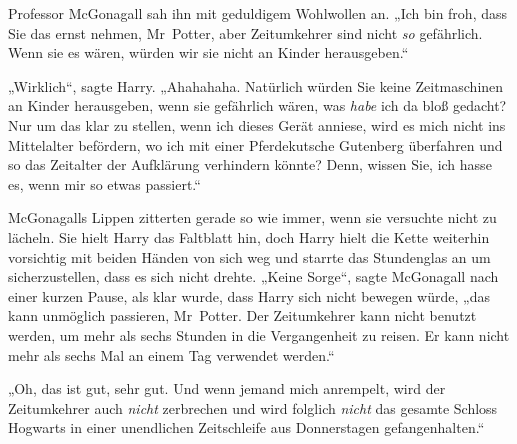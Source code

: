 Professor McGonagall sah ihn mit geduldigem Wohlwollen an. „Ich bin froh, dass Sie das ernst nehmen, Mr~Potter, aber Zeitumkehrer sind nicht \emph{so} gefährlich. Wenn sie es wären, würden wir sie nicht an Kinder herausgeben.“

„Wirklich“, sagte Harry. „Ahahahaha. Natürlich würden Sie keine Zeitmaschinen an Kinder herausgeben, wenn sie gefährlich wären, was \emph{habe} ich da bloß gedacht? Nur um das klar zu stellen, wenn ich dieses Gerät anniese, wird es mich nicht ins Mittelalter befördern, wo ich mit einer Pferdekutsche Gutenberg überfahren und so das Zeitalter der Aufklärung verhindern könnte? Denn, wissen Sie, ich hasse es, wenn mir so etwas passiert.“

McGonagalls Lippen zitterten gerade so wie immer, wenn sie versuchte nicht zu lächeln. Sie hielt Harry das Faltblatt hin, doch Harry hielt die Kette weiterhin vorsichtig mit beiden Händen von sich weg und starrte das Stundenglas an um sicherzustellen, dass es sich nicht drehte. „Keine Sorge“, sagte McGonagall nach einer kurzen Pause, als klar wurde, dass Harry sich nicht bewegen würde, „das kann unmöglich passieren, Mr~Potter. Der Zeitumkehrer kann nicht benutzt werden, um mehr als sechs Stunden in die Vergangenheit zu reisen. Er kann nicht mehr als sechs Mal an einem Tag verwendet werden.“

„Oh, das ist gut, sehr gut. Und wenn jemand mich anrempelt, wird der Zeitumkehrer auch \emph{nicht} zerbrechen und wird folglich \emph{nicht} das gesamte Schloss Hogwarts in einer unendlichen Zeitschleife aus Donnerstagen gefangenhalten.“

